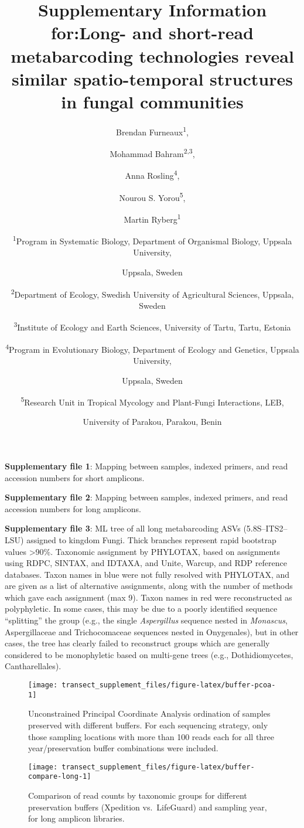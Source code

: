 \documentclass[
]{article}
\title{Supplementary Information for:Long- and short-read metabarcoding technologies reveal similar spatio-temporal structures in fungal communities}
\author{Brendan Furneaux\textsuperscript{1}, \and Mohammad Bahram\textsuperscript{2,3}, \and Anna Rosling\textsuperscript{4}, \and Nourou S. Yorou\textsuperscript{5}, \and Martin Ryberg\textsuperscript{1} \and \textsuperscript{1}Program in Systematic Biology, Department of Organismal Biology, Uppsala University, \and Uppsala, Sweden \and \textsuperscript{2}Department of Ecology, Swedish University of Agricultural Sciences, Uppsala, Sweden \and \textsuperscript{3}Institute of Ecology and Earth Sciences, University of Tartu, Tartu, Estonia \and \textsuperscript{4}Program in Evolutionary Biology, Department of Ecology and Genetics, Uppsala University, \and Uppsala, Sweden \and \textsuperscript{5}Research Unit in Tropical Mycology and Plant-Fungi Interactions, LEB, \and University of Parakou, Parakou, Benin}
\date{}
\begin{document}
\maketitle

\textbf{Supplementary file 1}: Mapping between samples, indexed primers, and read accession numbers for short amplicons.

\textbf{Supplementary file 2}: Mapping between samples, indexed primers, and read accession numbers for long amplicons.

\textbf{Supplementary file 3}: ML tree of all long metabarcoding ASVs (5.8S--ITS2--LSU) assigned to kingdom Fungi.
Thick branches represent rapid bootstrap values \textgreater90\%.
Taxonomic assignment by PHYLOTAX, based on assignments using RDPC, SINTAX, and IDTAXA, and Unite, Warcup, and RDP reference databases.
Taxon names in blue were not fully resolved with PHYLOTAX, and are given as a list of alternative assignments, along with the number of methods which gave each assignment (max 9).
Taxon names in red were reconstructed as polyphyletic.
In some cases, this may be due to a poorly identified sequence ``splitting'' the group (e.g., the single \emph{Aspergillus} sequence nested in \emph{Monascus}, Aspergillaceae and Trichocomaceae sequences nested in Onygenales), but in other cases, the tree has clearly failed to reconstruct groups which are generally considered to be monophyletic based on multi-gene trees (e.g., Dothidiomycetes, Cantharellales).





\begin{figure}

{\centering \texttt{[image: transect\_supplement\_files/figure-latex/buffer-pcoa-1]} 

}

\caption[Unconstrained Principal Coordinate Analysis ordination of samples preserved with different buffers]{Unconstrained Principal Coordinate Analysis ordination of samples preserved with different buffers. For each sequencing strategy, only those sampling locations with more than 100 reads each for all three year/preservation buffer combinations were included.}\label{fig:buffer-pcoa}
\end{figure}



\begin{figure}

{\centering \texttt{[image: transect\_supplement\_files/figure-latex/buffer-compare-long-1]} 

}

\caption{Comparison of read counts by taxonomic groups for different preservation buffers (Xpedition vs.~LifeGuard) and sampling year, for long amplicon libraries.}\label{fig:buffer-compare-long}
\end{figure}
\end{document}
